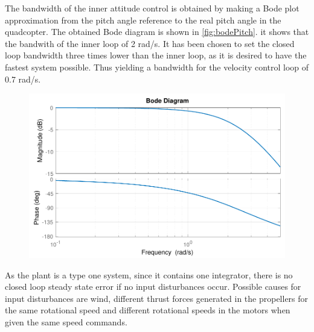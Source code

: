 The bandwidth of the inner attitude control is obtained by making a Bode plot approximation from the pitch angle reference to the real pitch angle in the quadcopter. The obtained Bode diagram is shown in \autoref{fig:bodePitch}. it shows that the bandwith of the inner loop of 2 rad/s. It has been chosen to set the closed loop bandwidth three times lower than the inner loop, as it is desired to have the fastest system possible. Thus yielding a bandwidth for the velocity control loop of 0.7 rad/s.
%
\begin{figure}[H]
    \includegraphics[scale=.8]{figures/bodePitch}
    \centering			
    \label{fig:bodePitch}
\end{figure} 
%
%
%
As the plant is a type one system, since it contains one integrator, there is no closed loop steady state error if no input disturbances occur. Possible causes for input disturbances are wind, different thrust forces generated in the propellers for the same rotational speed and different rotational speeds in the motors when given the same speed commands.

